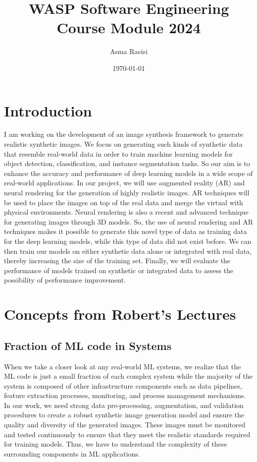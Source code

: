 \documentclass[11pt]{article}
\title{WASP Software Engineering Course Module 2024}
\author{Asma Raeisi}
\date{\today}
\begin{document}
\maketitle




\section{Introduction}

I am working on the development of an image synthesis framework to generate realistic synthetic images. We focus on generating such kinds of synthetic data that resemble real-world data in order to train machine learning models for object detection, classification, and instance segmentation tasks. So our aim is to enhance the accuracy and performance of deep learning models in a wide scope of real-world applications. In our project, we will use augmented reality (AR) and neural rendering for the generation of highly realistic images. AR techniques will be used to place the images on top of the real data and merge the virtual with physical environments. Neural rendering is also a recent and advanced technique for generating images through 3D models. So, the use of neural rendering and AR techniques makes it possible to generate this novel type of data as training data for the deep learning models, while this type of data did not exist before. We can then train our models on either synthetic data alone or integrated with real data, thereby increasing the size of the training set. Finally, we will evaluate the performance of models trained on synthetic or integrated data to assess the possibility of performance improvement.


 
\section{Concepts from Robert's Lectures}


\subsection{Fraction of ML code in Systems}

When we take a closer look at any real-world ML systems, we realize that the ML code is just a small fraction of each complex system while the majority of the system is composed of other infrastructure components such as data pipelines, feature extraction processes, monitoring, and process management mechanisms. In our work, we need strong data pre-processing, augmentation, and validation procedures to create a robust synthetic image generation model and ensure the quality and diversity of the generated images. These images must be monitored and tested continuously to ensure that they meet the realistic standards required for training models. Thus, we have to understand the complexity of these surrounding components in ML applications.
\end{document}
